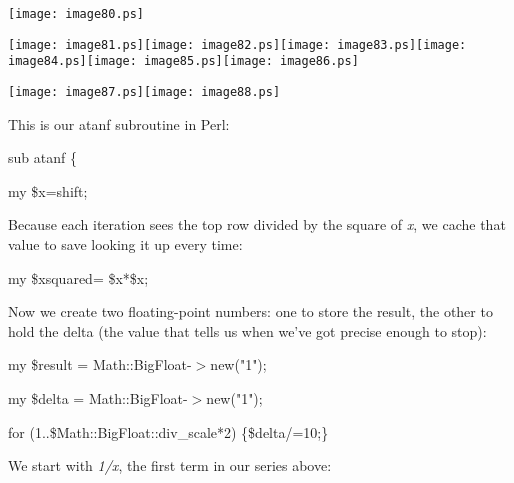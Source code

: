 \documentclass[a4paper,11pt]{book}
\begin{document}
\noindent \texttt{[image: image80.ps]}

\noindent \texttt{[image: image81.ps]}\texttt{[image: image82.ps]}\texttt{[image: image83.ps]}\texttt{[image: image84.ps]}\texttt{[image: image85.ps]}\texttt{[image: image86.ps]}

\noindent \texttt{[image: image87.ps]}\texttt{[image: image88.ps]}

\noindent 

\noindent 

\noindent This is our atanf subroutine in Perl:

\noindent 

\noindent 

\noindent sub atanf \{

\noindent my \$x=shift;

\noindent 

\noindent Because each iteration sees the top row divided by the square of \textit{x}, we cache that value to save looking it up every time:

\noindent 

\noindent my \$xsquared= \$x*\$x;

\noindent 

\noindent Now we create two floating-point numbers: one to store the result, the other to hold the delta (the value that tells us when we've got precise enough to stop):

\noindent 

\noindent my \$result = Math::BigFloat-$>$new("1");

\noindent my \$delta = Math::BigFloat-$>$new("1");

\noindent for (1..\$Math::BigFloat::div\_scale*2) \{\$delta/=10;\}

\noindent 

\noindent We start with \textit{1/x}, the first term in our series above:
\end{document}
